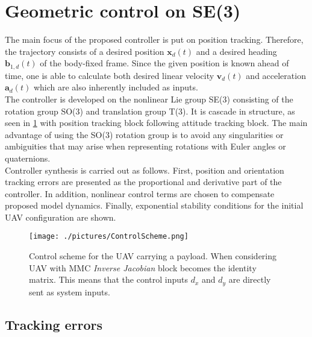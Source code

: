 \section{Geometric control on SE(3)}

The main focus of the proposed controller is put on position tracking. Therefore, the trajectory consists of a desired position $\textbf{x}_d(t)$ and a desired heading $\textbf{b}_{1,d}(t)$ of the body-fixed frame. Since the given position is known ahead of time, one is able to calculate both desired linear velocity $\textbf{v}_d(t)$ and acceleration $\textbf{a}_d(t)$ which are also inherently included as inputs. \\
The controller is developed on the nonlinear Lie group SE(3) consisting of the rotation group SO(3) and translation group T(3). It is cascade in structure, as seen in \ref{fig:control_scheme} with position tracking block following attitude tracking block. The main advantage of using the SO(3) rotation group is to avoid any singularities or ambiguities that may arise when representing rotations with Euler angles or quaternions. \\
Controller synthesis is carried out as follows. First, position and orientation tracking errors are presented as the proportional and derivative part of the controller. In addition, nonlinear control terms are chosen to compensate proposed model dynamics. Finally, exponential stability conditions for the initial UAV configuration are shown.

\begin{figure}[h!]
	\centering
	\texttt{[image: ./pictures/ControlScheme.png]}	
	\caption{Control scheme for the UAV carrying a payload. When considering UAV with MMC \textit{Inverse Jacobian} block becomes the identity matrix. This means that the control inputs $d_x$ and $d_y$ are directly sent as system inputs.}
	\label{fig:control_scheme}
\end{figure}

\subsection{Tracking errors}

